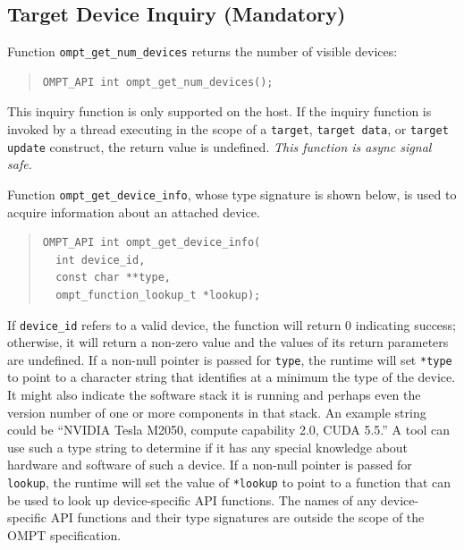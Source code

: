\documentclass{article}
\begin{document}
\subsection{Target Device Inquiry (Mandatory)}
\label{sec:target-region}
Function \verb|ompt_get_num_devices| returns the number of visible devices:
\begin{quote}
\begin{verbatim}
OMPT_API int ompt_get_num_devices();
\end{verbatim}
\end{quote}
This inquiry function is only supported on the host. If the inquiry function is invoked by a thread executing in the scope of a {\tt target}, {\tt target data}, or {\tt target update} construct, the return value is undefined. {\it This function is async signal safe.}

Function \verb|ompt_get_device_info|, whose type signature is shown below, is used to acquire information about an attached device. 
\begin{quote}
\begin{verbatim}
OMPT_API int ompt_get_device_info(
  int device_id, 
  const char **type, 
  ompt_function_lookup_t *lookup);
\end{verbatim}
\end{quote}
If \verb|device_id| refers to a valid device, the function will return 0 indicating success; otherwise, it will return a non-zero value and the values of its return parameters are undefined. If a non-null pointer is passed for \verb|type|, the runtime will set \verb|*type| to point to a character string that identifies at a minimum the  type of the device. It might also indicate the software stack it is running and perhaps even the version number of one or more components in that stack. An example string could be ``NVIDIA Tesla M2050, compute capability 2.0, CUDA 5.5.'' A tool can use such a type string to determine if it has any special knowledge about hardware and software of such a device. If a non-null pointer is passed for \verb|lookup|, the runtime will set the value of \verb|*lookup| to point to a function that can be used to look up device-specific API functions.  The names of any device-specific API functions and their type signatures are outside the scope of the OMPT specification. 

\end{document}
